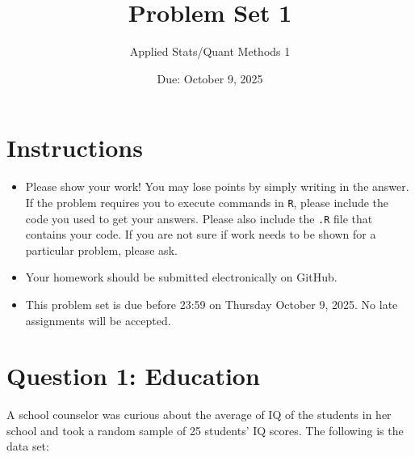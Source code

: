 \documentclass[12pt,letterpaper]{article}
\title{Problem Set 1}
\date{Due: October 9, 2025}
\author{Applied Stats/Quant Methods 1}
\begin{document}
	\maketitle
	
	\section*{Instructions}
	\begin{itemize}
	\item Please show your work! You may lose points by simply writing in the answer. If the problem requires you to execute commands in \texttt{R}, please include the code you used to get your answers. Please also include the \texttt{.R} file that contains your code. If you are not sure if work needs to be shown for a particular problem, please ask.
\item Your homework should be submitted electronically on GitHub.
\item This problem set is due before 23:59 on Thursday October 9, 2025. No late assignments will be accepted.
	\end{itemize}
	
	\vspace{1cm}
	\section*{Question 1: Education}

A school counselor was curious about the average of IQ of the students in her school and took a random sample of 25 students' IQ scores. The following is the data set:   
\vspace{.1cm}

\vspace{1cm}
\end{document}
